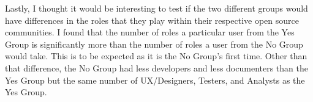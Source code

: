 Lastly, I thought it would be interesting to test if the two different groups would have differences in the roles that they play within their respective open source communities. I found that the number of roles a particular user from the Yes Group is significantly more than the number of roles a user from the No Group would take. This is to be expected as it is the No Group's first time. Other than that difference, the No Group had less developers and less documenters than the Yes Group but the same number of UX/Designers, Testers, and Analysts as the Yes Group. 
